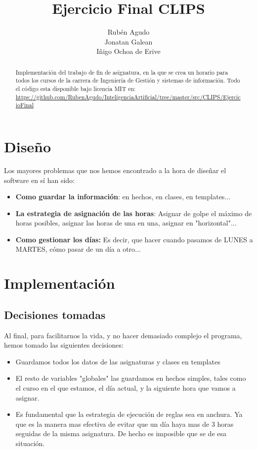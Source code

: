 \documentclass{report}
\title{Ejercicio Final CLIPS}
\author{Rub\'{e}n Agudo \\
    Jonatan Galean \\
    I\~{n}igo Ochoa de Erive}
\begin{document}
\maketitle
\tableofcontents

\begin{abstract}
    Implementaci\'{o}n del trabajo de fin de asignatura, en la que se crea un horario 
    para todos los cursos de la carrera de Ingenier\'{i}a de Gesti\'{o}n y sistemas de informaci\'{o}n.
    Todo el c\'{o}digo esta disponible bajo licencia MIT en: 
    \url{https://github.com/RubenAgudo/InteligenciaArtificial/tree/master/src/CLIPS/EjercicioFinal}
\end{abstract}

\chapter{Dise\~{n}o}
Los mayores problemas que nos hemos encontrado a la hora de dise\~{n}ar el software en s\'{i} han sido:
\begin{itemize}
	\item \textbf{Como guardar la informaci\'{o}n}: en hechos, en clases, en templates...
	\item \textbf{La estrategia de asignaci\'{o}n de las horas}: 
	Asignar de golpe el m\'{a}ximo de horas posibles, asignar las horas de una en una, asignar en "horizontal"...
	\item \textbf{Como gestionar los d\'{i}as:} Es decir, que hacer cuando pasamos de 
	LUNES a MARTES, c\'{o}mo pasar de un d\'{i}a a otro...
\end{itemize}

\chapter{Implementaci\'{o}n}

\section{Decisiones tomadas}

Al final, para facilitarnos la vida, y no hacer demasiado complejo el programa, hemos tomado las siguientes decisiones:
\begin{itemize}
	\item Guardamos todos los datos de las asignaturas y clases en templates
	\item El resto de variables "globales" las guardamos en hechos simples, tales como el curso en el que 
	estamos, el d\'{i}a actual, y la siguiente hora que vamos a asignar.
    \item Es fundamental que la estrategia de ejecuci\'{o}n de reglas sea en anchura. Ya que es la manera mas efectiva
    de evitar que un d\'{i}a haya mas de 3 horas seguidas de la misma asignatura. De hecho es imposible que se de esa situaci\'{o}n.
\end{itemize}
\end{document}
